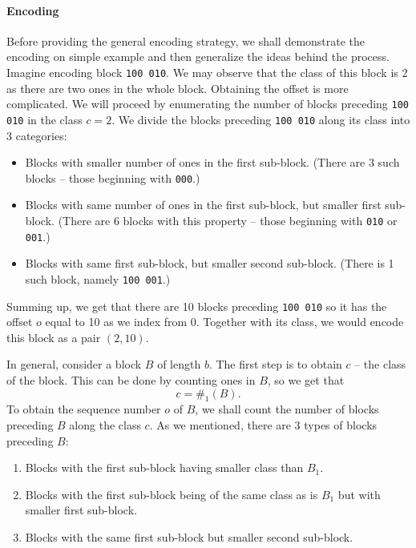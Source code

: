 \paragraph{Encoding}

Before providing the general encoding strategy, we shall demonstrate the encoding on
simple example and then generalize the ideas behind the process. Imagine encoding
block {\tt 100 010}. We may observe that the class of this block is 2 as there are two ones in
the whole block. Obtaining the offset is more complicated. We will proceed by enumerating the
number of blocks preceding {\tt 100 010} in the class $c=2$. We divide the blocks preceding
{\tt 100 010} along its class into 3 categories:

\begin{itemize}
    \item Blocks with smaller number of ones in the first sub-block.
    (There are 3 such blocks -- those beginning with {\tt 000}.)
    \item Blocks with same number of ones in the first sub-block, but smaller first sub-block.
    (There are 6 blocks with this property -- those beginning with {\tt 010} or {\tt 001}.)
    \item Blocks with same first sub-block, but smaller second sub-block.
    (There is 1 such block, namely {\tt 100 001}.)
\end{itemize}

Summing up, we get that there are 10 blocks preceding {\tt 100 010} so it has the offset $o$
equal to 10 as we index from 0. Together with its class, we would encode this block as a pair
$(2, 10)$.

In general, consider a block $B$ of length $b$. The first step is to obtain
$c$ -- the class of the block. This can be done by counting ones in $B$, so we
get that $$c=\#_1(B).$$ To obtain the sequence number $o$ of $B$, we shall
count the number of blocks preceding $B$ along the class $c$. As we mentioned,
there are 3 types of blocks preceding $B$:

\begin{enumerate}
    \item Blocks with the first sub-block having smaller class than $B_1$.
    \label{chapter3:encoding:1}
    \item Blocks with the first sub-block being of the same class as is $B_1$
    but with smaller first sub-block. \label{chapter3:encoding:2}
    \item Blocks with the same first sub-block but smaller second sub-block.
    \label{chapter3:encoding:3}
\end{enumerate}

